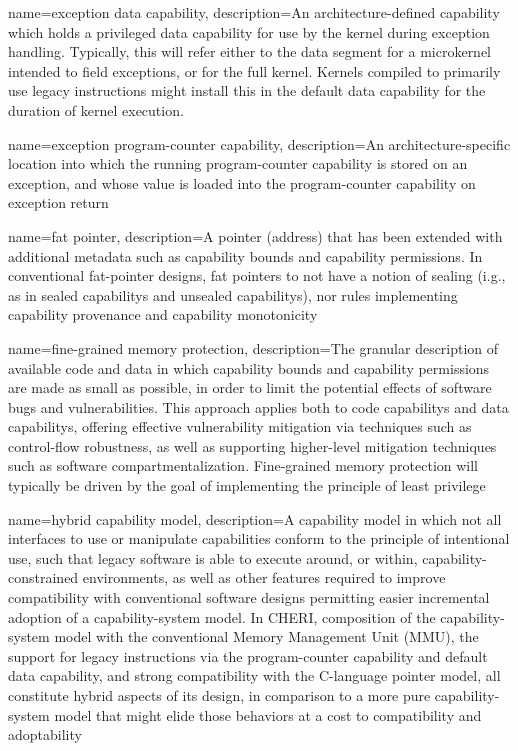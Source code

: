 {
  name=exception data capability,
  description={An architecture-defined capability which holds a
    privileged \gls{data capability} for use by the kernel during exception
    handling.
    Typically, this will refer either to the data segment for a microkernel
    intended to field exceptions, or for the full kernel.
    Kernels compiled to primarily use \gls{legacy instructions} might install
    this in the \gls{default data capability} for the duration of kernel
    execution.}
}

{
  name=exception program-counter capability,
  description={An architecture-specific location into which the running
    \gls{program-counter capability} is stored on an exception, and
    whose value is loaded into the program-counter capability on
    exception return}
}

{
  name=fat pointer,
  description={A \gls{pointer} (\gls{address}) that has been extended
    with additional metadata such as \gls{capability bounds} and
    \gls{capability permissions}.
    In conventional fat-pointer designs, fat pointers to not have a notion of
    sealing (i.g., as in \glspl{sealed capability} and \glspl{unsealed
    capability}), nor rules implementing \gls{capability provenance} and
    \gls{capability monotonicity}}
}

{
  name=fine-grained memory protection,
  description={The granular description of available code and data in which
    \gls{capability bounds} and \gls{capability permissions} are made as
    small as possible, in order to limit the potential effects of software
    bugs and vulnerabilities.
    This approach applies both to \glspl{code capability} and \glspl{data
    capability}, offering effective \gls{vulnerability mitigation} via
    techniques such as \gls{control-flow robustness}, as well as supporting
    higher-level mitigation techniques such as \gls{software
    compartmentalization}.
    Fine-grained memory protection will typically be driven by the goal of
    implementing the \gls{principle of least privilege}}
}

{
  name=hybrid capability model,
  description={A \gls{capability} model in which not all interfaces to use or
    manipulate capabilities conform to the \gls{principle of intentional
    use}, such that legacy software is able to execute around, or within,
    capability-constrained environments, as well as other features required
    to improve compatibility with conventional software designs permitting
    easier incremental adoption of a capability-system model.
    In CHERI, composition of the capability-system model with the conventional
    Memory Management Unit (MMU), the support for \gls{legacy instructions}
    via the \gls{program-counter capability} and \gls{default data
    capability}, and strong compatibility with the C-language \gls{pointer}
    model, all constitute hybrid aspects of its design, in comparison to a
    more pure capability-system model that might elide those behaviors at a
    cost to compatibility and adoptability}
}

